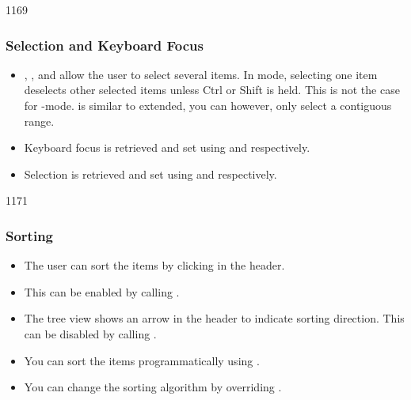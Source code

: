 \begin{slide}{1169}\frametitle{Selection and Keyboard Focus}
\begin{itemize}
\item {},
  , and  allow the user to select 
  several items. In  mode, selecting one item deselects
  other selected items unless Ctrl or Shift is held. This is not
  the case for
  -mode.  is similar to extended, you can however, only select a contiguous range.
\item Keyboard focus is retrieved and set using
   and 
  respectively.
\item Selection is retrieved and set using
   and
   respectively.
\end{itemize}
\end{slide}





\begin{slide}{1171}\frametitle{Sorting}
\begin{itemize}
\item The user can sort the items by clicking in the header.
\item This can be enabled by calling
  .
\item The tree view shows an arrow in the header to indicate sorting
  direction. This can be disabled by calling
  .
\item You can sort the items programmatically using
  .
\item You can change the sorting algorithm by overriding
  .
\end{itemize}
\end{slide}

